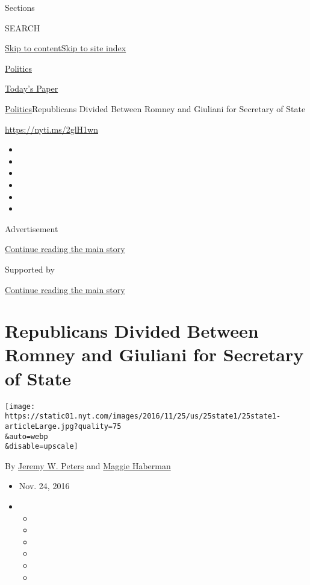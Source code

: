 Sections

SEARCH

\protect\hyperlink{site-content}{Skip to
content}\protect\hyperlink{site-index}{Skip to site index}

\href{https://www.nytimes.com/section/politics}{Politics}

\href{https://myaccount.nytimes.com/auth/login?response_type=cookie\&client_id=vi}{}

\href{https://www.nytimes.com/section/todayspaper}{Today's Paper}

\href{/section/politics}{Politics}\textbar{}Republicans Divided Between
Romney and Giuliani for Secretary of State

\url{https://nyti.ms/2glH1wn}

\begin{itemize}
\item
\item
\item
\item
\item
\item
\end{itemize}

Advertisement

\protect\hyperlink{after-top}{Continue reading the main story}

Supported by

\protect\hyperlink{after-sponsor}{Continue reading the main story}

\hypertarget{republicans-divided-between-romney-and-giuliani-for-secretary-of-state}{%
\section{Republicans Divided Between Romney and Giuliani for Secretary
of
State}\label{republicans-divided-between-romney-and-giuliani-for-secretary-of-state}}

\texttt{[image: https://static01.nyt.com/images/2016/11/25/us/25state1/25state1-articleLarge.jpg?quality=75\\\&auto=webp\\\&disable=upscale]}

By \href{http://www.nytimes.com/by/jeremy-w-peters}{Jeremy W. Peters}
and \href{http://www.nytimes.com/by/maggie-haberman}{Maggie Haberman}

\begin{itemize}
\item
  Nov. 24, 2016
\item
  \begin{itemize}
  \item
  \item
  \item
  \item
  \item
  \item
  \end{itemize}
\end{itemize}

